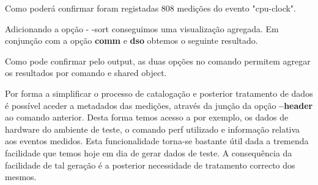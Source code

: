 \documentclass[conference,compsoc]{IEEEtran}
\begin{document}

                                                                                                                                                                                                                       Como poderá confirmar foram registadas 808 medições do evento "cpu-clock".\par
                                                                                                                                                                                                                       Adicionando a opção - -sort  conseguimos uma visualização agregada. Em conjunção com a opção \textbf{comm} e \textbf{dso} obtemos o seguinte resultado.


                                                                                                                                                                                                                       Como pode confirmar pelo output, as duas opções no comando permitem agregar os resultados por comando e shared object.\par 

                                                                                                                                                                                                                       Por forma a simplificar o processo de catalogação e posterior tratamento de dados é possível aceder a metadados das medições, através da junção da opção \textbf{--header} ao comando anterior.
                                                                                                                                                                                                                       Desta forma temos acesso a por exemplo, os dados de hardware do ambiente de teste, o comando perf utilizado e informação relativa aos eventos medidos. Esta funcionalidade torna-se bastante útil dada a tremenda facilidade que temos hoje em dia de gerar dados de teste. A consequência da facilidade de tal geração é a posterior necessidade de tratamento correcto dos mesmos.\par 
\end{document}

